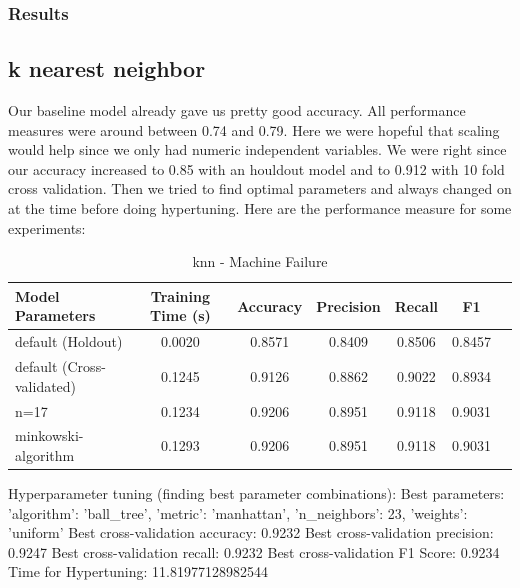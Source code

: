 \documentclass{article}
\begin{document}
\subsubsection{Results}
\subsection*{k nearest neighbor}
Our baseline model already gave us pretty good accuracy. All performance measures were around between 0.74 and 0.79. Here we were hopeful that scaling would help since we only had numeric independent variables. We were right since our accuracy increased to 0.85 with an houldout model and to 0.912 with 10 fold cross validation. Then we tried to find optimal parameters and always changed on at the time before doing hypertuning. Here are the performance measure for some experiments:

\begin{table}[ht]
\centering
\begin{tabular}{l|c|c|c|c|c|c}
\textbf{Model Parameters} & \textbf{Training Time (s)} & \textbf{Accuracy} & \textbf{Precision} & \textbf{Recall} & \textbf{F1} \\\hline
default (Holdout) & 0.0020 & 0.8571 & 0.8409 & 0.8506 & 0.8457 \\
default (Cross-validated) & 0.1245  & 0.9126 & 0.8862 &0.9022 & 0.8934\\
n=17 & 0.1234  & 0.9206 & 0.8951 & 0.9118 & 0.9031 \\
minkowski-algorithm & 0.1293  & 0.9206 & 0.8951 & 0.9118 & 0.9031 \\
\end{tabular}
\caption{knn - Machine Failure}
\label{tab:knn - Machine Failure}
\end{table}

Hyperparameter tuning (finding best parameter combinations):
Best parameters: {'algorithm': 'ball_tree', 'metric': 'manhattan', 'n_neighbors': 23, 'weights': 'uniform'}
Best cross-validation accuracy: 0.9232
Best cross-validation precision: 0.9247
Best cross-validation recall: 0.9232
Best cross-validation F1 Score: 0.9234
Time for Hypertuning:  11.81977128982544
\end{document}
